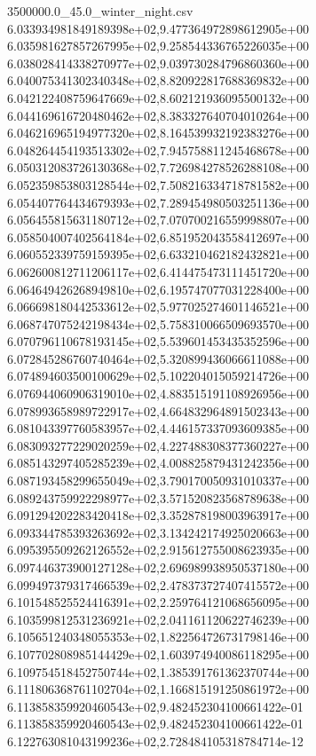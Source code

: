 \begin{filecontents*}{3500000.0_45.0_winter_night.csv}
6.033934981849189398e+02,9.477364972898612905e+00
6.035981627857267995e+02,9.258544336765226035e+00
6.038028414338270977e+02,9.039730284796860360e+00
6.040075341302340348e+02,8.820922817688369832e+00
6.042122408759647669e+02,8.602121936095500132e+00
6.044169616720480462e+02,8.383327640704010264e+00
6.046216965194977320e+02,8.164539932192383276e+00
6.048264454193513302e+02,7.945758811245468678e+00
6.050312083726130368e+02,7.726984278526288108e+00
6.052359853803128544e+02,7.508216334718781582e+00
6.054407764434679393e+02,7.289454980503251136e+00
6.056455815631180712e+02,7.070700216559998807e+00
6.058504007402564184e+02,6.851952043558412697e+00
6.060552339759159395e+02,6.633210462182432821e+00
6.062600812711206117e+02,6.414475473111451720e+00
6.064649426268949810e+02,6.195747077031228400e+00
6.066698180442533612e+02,5.977025274601146521e+00
6.068747075242198434e+02,5.758310066509693570e+00
6.070796110678193145e+02,5.539601453435352596e+00
6.072845286760740464e+02,5.320899436066611088e+00
6.074894603500100629e+02,5.102204015059214726e+00
6.076944060906319010e+02,4.883515191108926956e+00
6.078993658989722917e+02,4.664832964891502343e+00
6.081043397760583957e+02,4.446157337093609385e+00
6.083093277229020259e+02,4.227488308377360227e+00
6.085143297405285239e+02,4.008825879431242356e+00
6.087193458299655049e+02,3.790170050931010337e+00
6.089243759922298977e+02,3.571520823568789638e+00
6.091294202283420418e+02,3.352878198003963917e+00
6.093344785393263692e+02,3.134242174925020663e+00
6.095395509262126552e+02,2.915612755008623935e+00
6.097446373900127128e+02,2.696989938950537180e+00
6.099497379317466539e+02,2.478373727407415572e+00
6.101548525524416391e+02,2.259764121068656095e+00
6.103599812531236921e+02,2.041161120622746239e+00
6.105651240348055353e+02,1.822564726731798146e+00
6.107702808985144429e+02,1.603974940086118295e+00
6.109754518452750744e+02,1.385391761362370744e+00
6.111806368761102704e+02,1.166815191250861972e+00
6.113858359920460543e+02,9.482452304100661422e-01
6.113858359920460543e+02,9.482452304100661422e-01
6.122763081043199236e+02,2.728484105318784714e-12
\end{filecontents*}

